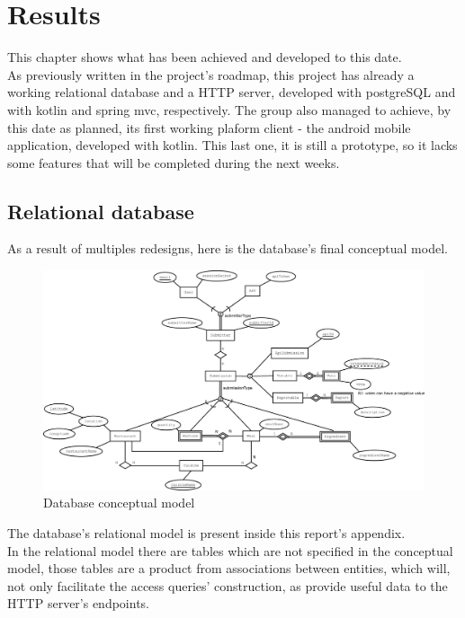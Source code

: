 %
%
\chapter{Results}

This chapter shows what has been achieved and developed to this date.\\

As previously written in the project's roadmap, this project has already a working relational database
and a HTTP server, developed with postgreSQL and with kotlin and spring mvc, respectively. The group also
managed to achieve, by this date as planned, its first working plaform client - the android mobile application, developed
with kotlin. This last one, it is still a prototype, so it lacks some features that will be completed during the next weeks.

\section{Relational database}

As a result of multiples redesigns, here is the database's final conceptual model.

\begin{figure}[H]    
    \includegraphics[scale=0.25]{_figures/Nutr.io_Database_Diagram.eps}
    \caption{Database conceptual model}
\end{figure}

\newpage
The database's relational model is present inside this report's appendix.\\

In the relational model there are tables which are not specified in the conceptual model,
those tables are a product from associations between entities, which will, not only facilitate the access queries' construction,
as provide useful data to the HTTP server's endpoints.\\

